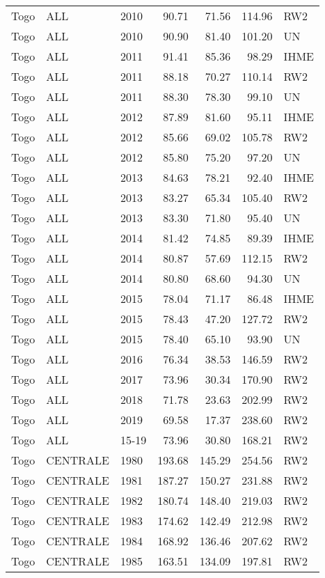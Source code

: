 \begin{longtable}{lllrrrl}
  Togo & ALL & 2010 & 90.71 & 71.56 & 114.96 & RW2 \\ 
  Togo & ALL & 2010 & 90.90 & 81.40 & 101.20 & UN \\ 
  Togo & ALL & 2011 & 91.41 & 85.36 & 98.29 & IHME \\ 
  Togo & ALL & 2011 & 88.18 & 70.27 & 110.14 & RW2 \\ 
  Togo & ALL & 2011 & 88.30 & 78.30 & 99.10 & UN \\ 
  Togo & ALL & 2012 & 87.89 & 81.60 & 95.11 & IHME \\ 
  Togo & ALL & 2012 & 85.66 & 69.02 & 105.78 & RW2 \\ 
  Togo & ALL & 2012 & 85.80 & 75.20 & 97.20 & UN \\ 
  Togo & ALL & 2013 & 84.63 & 78.21 & 92.40 & IHME \\ 
  Togo & ALL & 2013 & 83.27 & 65.34 & 105.40 & RW2 \\ 
  Togo & ALL & 2013 & 83.30 & 71.80 & 95.40 & UN \\ 
  Togo & ALL & 2014 & 81.42 & 74.85 & 89.39 & IHME \\ 
  Togo & ALL & 2014 & 80.87 & 57.69 & 112.15 & RW2 \\ 
  Togo & ALL & 2014 & 80.80 & 68.60 & 94.30 & UN \\ 
  Togo & ALL & 2015 & 78.04 & 71.17 & 86.48 & IHME \\ 
  Togo & ALL & 2015 & 78.43 & 47.20 & 127.72 & RW2 \\ 
  Togo & ALL & 2015 & 78.40 & 65.10 & 93.90 & UN \\ 
  Togo & ALL & 2016 & 76.34 & 38.53 & 146.59 & RW2 \\ 
  Togo & ALL & 2017 & 73.96 & 30.34 & 170.90 & RW2 \\ 
  Togo & ALL & 2018 & 71.78 & 23.63 & 202.99 & RW2 \\ 
  Togo & ALL & 2019 & 69.58 & 17.37 & 238.60 & RW2 \\ 
  Togo & ALL & 15-19 & 73.96 & 30.80 & 168.21 & RW2 \\ 
  Togo & CENTRALE & 1980 & 193.68 & 145.29 & 254.56 & RW2 \\ 
  Togo & CENTRALE & 1981 & 187.27 & 150.27 & 231.88 & RW2 \\ 
  Togo & CENTRALE & 1982 & 180.74 & 148.40 & 219.03 & RW2 \\ 
  Togo & CENTRALE & 1983 & 174.62 & 142.49 & 212.98 & RW2 \\ 
  Togo & CENTRALE & 1984 & 168.92 & 136.46 & 207.62 & RW2 \\ 
  Togo & CENTRALE & 1985 & 163.51 & 134.09 & 197.81 & RW2 \\ 

\end{longtable}
